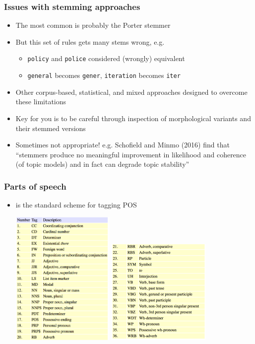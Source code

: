 \documentclass[11pt,handout]{beamer}
\begin{document}
\begin{frame}
  \frametitle{Issues with stemming approaches}
  \begin{itemize}[<+->]
  \item The most common is probably the \alert{Porter} stemmer
  \item But this set of rules gets many stems wrong, e.g.
    \begin{itemize}
    \item \texttt{policy} and \texttt{police} considered (wrongly) equivalent
    \item \texttt{general} becomes \texttt{gener}, \texttt{iteration}
      becomes \texttt{iter}
    \end{itemize}
  \item Other corpus-based, statistical, and mixed approaches designed
    to overcome these limitations
  \item Key for you is to be careful through inspection of
    morphological variants and their stemmed versions
  \item Sometimes not appropriate! e.g. Schofield and Minmo (2016) find that \small{``stemmers produce no meaningful improvement in likelihood and coherence (of topic models) and in fact can degrade topic stability''}
\end{itemize}
\end{frame}


\begin{frame}[fragile]
 \frametitle{Parts of speech}
 \begin{itemize}
  \item {}
        is the standard scheme for tagging POS
        \vspace{.25cm}

        \includegraphics[width=5cm]{penntreebank1.png} \includegraphics[width=5cm]{penntreebank2.png}
 \end{itemize}
\end{frame}
\end{document}
